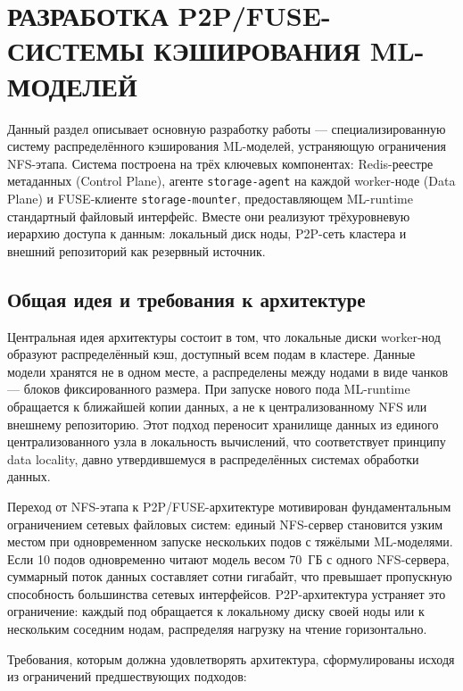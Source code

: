 \section{РАЗРАБОТКА P2P/FUSE-СИСТЕМЫ КЭШИРОВАНИЯ ML-МОДЕЛЕЙ}

Данный раздел описывает основную разработку работы --- специализированную систему распределённого кэширования ML-моделей, устраняющую ограничения NFS-этапа. Система построена на трёх ключевых компонентах: Redis-реестре метаданных (Control Plane), агенте \texttt{storage-agent} на каждой worker-ноде (Data Plane) и FUSE-клиенте \texttt{storage-mounter}, предоставляющем ML-runtime стандартный файловый интерфейс. Вместе они реализуют трёхуровневую иерархию доступа к данным: локальный диск ноды, P2P-сеть кластера и внешний репозиторий как резервный источник.

\subsection{Общая идея и требования к архитектуре}

Центральная идея архитектуры состоит в том, что локальные диски worker-нод образуют распределённый кэш, доступный всем подам в кластере. Данные модели хранятся не в одном месте, а распределены между нодами в виде чанков --- блоков фиксированного размера. При запуске нового пода ML-runtime обращается к ближайшей копии данных, а не к централизованному NFS или внешнему репозиторию. Этот подход переносит хранилище данных из единого централизованного узла в локальность вычислений, что соответствует принципу data locality, давно утвердившемуся в распределённых системах обработки данных.

Переход от NFS-этапа к P2P/FUSE-архитектуре мотивирован фундаментальным ограничением сетевых файловых систем: единый NFS-сервер становится узким местом при одновременном запуске нескольких подов с тяжёлыми ML-моделями. Если 10 подов одновременно читают модель весом 70~ГБ с одного NFS-сервера, суммарный поток данных составляет сотни гигабайт, что превышает пропускную способность большинства сетевых интерфейсов. P2P-архитектура устраняет это ограничение: каждый под обращается к локальному диску своей ноды или к нескольким соседним нодам, распределяя нагрузку на чтение горизонтально.

Требования, которым должна удовлетворять архитектура, сформулированы исходя из ограничений предшествующих подходов:

